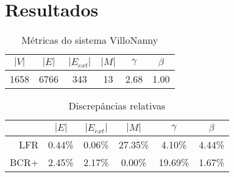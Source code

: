\documentclass{acm_proc_article-sp}
\begin{document}




\section{Resultados} \label{sec:resultados}

\begin{table}
\caption{Métricas do sistema VilloNanny}
\begin{center}
\begin{tabular}{c c c c c c}
\hline
\hline
$|V|$ & $|E|$ & $|E_{ext}|$ & $|M|$ & $\gamma$ & $\beta$ \\
\hline
1658  & 6766  & 343         &  13   & 2.68     & 1.00 \\
\hline
\end{tabular}
\end{center}
\end{table}

\begin{table}
\caption{Discrepâncias relativas}
\begin{center}
\begin{tabular}{r | c c c c c}
\hline
\hline
    & $|E|$ & $|E_{ext}|$ & $|M|$ & $\gamma$ & $\beta$ \\
\hline
LFR & 0.44\% & 0.06\%   & 27.35\% & 4.10\%   & 4.44\% \\
BCR+ & 2.45\% & 2.17\%   & 0.00\%  & 19.69\%  & 1.67\% \\
\hline
\end{tabular}
\end{center}
\end{table}
\end{document}
